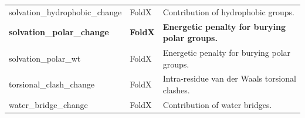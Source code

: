 \begin{table}[tb]
\begin{tabular}{ l | l | p{8cm} }
		solvation\_hydrophobic\_change        & FoldX            & Contribution of hydrophobic groups.                                                                        \\
		\textbf{solvation\_polar\_change}     & \textbf{FoldX}   & \textbf{Energetic penalty for burying polar groups.}                                                       \\
		solvation\_polar\_wt                  & FoldX            & Energetic penalty for burying polar groups.                                                                \\
		torsional\_clash\_change              & FoldX            & Intra-residue van der Waals torsional clashes.                                                             \\
		water\_bridge\_change                 & FoldX            & Contribution of water bridges.                                                                             \\
		\bottomrule
	\end{tabular}
\end{table}
